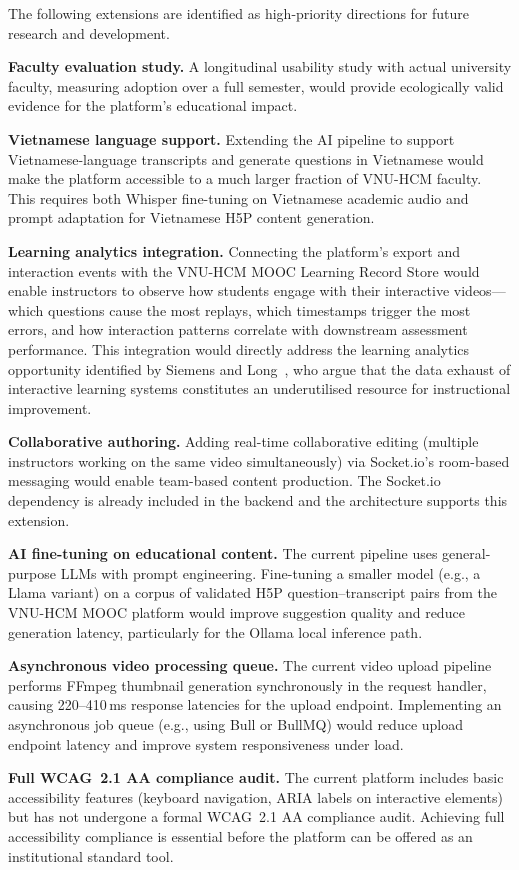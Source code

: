 The following extensions are identified as high-priority directions for
future research and development.

\textbf{Faculty evaluation study.} A longitudinal usability study with
actual university faculty, measuring adoption over a full semester, would
provide ecologically valid evidence for the platform's educational impact.

\textbf{Vietnamese language support.} Extending the AI pipeline to support
Vietnamese-language transcripts and generate questions in Vietnamese would
make the platform accessible to a much larger fraction of VNU-HCM faculty.
This requires both Whisper fine-tuning on Vietnamese academic audio and
prompt adaptation for Vietnamese H5P content generation.

\textbf{Learning analytics integration.} Connecting the platform's export
and interaction events with the VNU-HCM MOOC Learning Record Store would
enable instructors to observe how students engage with their interactive
videos---which questions cause the most replays, which timestamps trigger
the most errors, and how interaction patterns correlate with downstream
assessment performance. This integration would directly address the
learning analytics opportunity identified by Siemens and
Long~\cite{siemens2011}, who argue that the data exhaust of interactive
learning systems constitutes an underutilised resource for instructional
improvement.

\textbf{Collaborative authoring.} Adding real-time collaborative editing
(multiple instructors working on the same video simultaneously) via
Socket.io's room-based messaging would enable team-based content production.
The Socket.io dependency is already included in the backend and the
architecture supports this extension.

\textbf{AI fine-tuning on educational content.} The current pipeline uses
general-purpose LLMs with prompt engineering. Fine-tuning a smaller model
(e.g., a Llama variant) on a corpus of validated H5P question--transcript
pairs from the VNU-HCM MOOC platform would improve suggestion quality and
reduce generation latency, particularly for the Ollama local inference path.

\textbf{Asynchronous video processing queue.} The current video upload
pipeline performs FFmpeg thumbnail generation synchronously in the request
handler, causing 220--410\,ms response latencies for the upload endpoint.
Implementing an asynchronous job queue (e.g., using Bull or BullMQ) would
reduce upload endpoint latency and improve system responsiveness under load.

\textbf{Full WCAG~2.1 AA compliance audit.} The current platform includes
basic accessibility features (keyboard navigation, ARIA labels on interactive
elements) but has not undergone a formal WCAG~2.1 AA compliance audit.
Achieving full accessibility compliance is essential before the platform can
be offered as an institutional standard tool.
